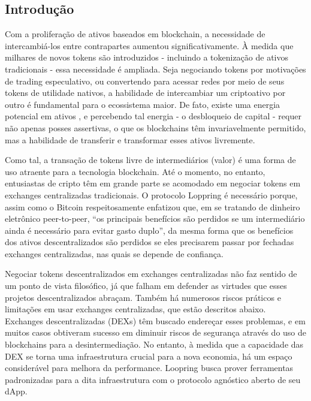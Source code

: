 \documentclass[UTF8,nofonts]{article}
\begin{document}
\begin{multicols}{2}
\section{Introdução\label{sec:introduction}}

Com a proliferação de ativos baseados em blockchain, a necessidade de intercambiá-los entre contrapartes aumentou significativamente. À medida que milhares de novos tokens são introduzidos - incluindo a tokenização de ativos tradicionais - essa necessidade é ampliada. Seja negociando tokens por motivações de trading especulativo, ou convertendo para acessar redes por meio de seus tokens de utilidade nativos, a habilidade de intercambiar um criptoativo por outro é fundamental para o ecossistema maior. De fato, existe uma energia potencial em ativos \cite{desotocapital}, e percebendo tal energia - o desbloqueio de capital - requer não apenas posses assertivas, o que os blockchains têm invariavelmente permitido, mas a habilidade de transferir e transformar esses ativos livremente.
 
Como tal, a transação de tokens livre de intermediários (valor) é uma forma de uso atraente para a tecnologia blockchain. Até o momento, no entanto, entusiastas de cripto têm em grande parte se acomodado em negociar tokens em exchanges centralizadas tradicionais. O protocolo Loppring é necessário porque, assim como o Bitcoin \cite{nakamoto2008bitcoin} respeitosamente enfatizou que, em se tratando de dinheiro eletrônico peer-to-peer, \enquote{os principais benefícios são perdidos se um intermediário ainda é necessário para evitar gasto duplo}, da mesma forma que os benefícios dos ativos descentralizados são perdidos se eles precisarem passar por fechadas exchanges centralizadas, nas quais se depende de confiança.

Negociar tokens descentralizados em exchanges centralizadas não faz sentido de um ponto de vista filosófico, já que falham em defender as virtudes que esses projetos descentralizados abraçam. Também há numerosos riscos práticos e limitações em usar exchanges centralizadas, que estão descritos abaixo. Exchanges descentralizadas (DEXs) \cite{schuh2015bitshares} \cite{bancor} \cite{kyber} têm buscado endereçar esses problemas, e em muitos casos obtiveram sucesso em diminuir riscos de segurança através do uso de blockchains para a desintermediação. No entanto, à medida que a capacidade das DEX se torna uma infraestrutura crucial para a nova economia, há um espaço considerável para melhora da performance. Loopring busca prover ferramentas padronizadas para a dita infraestrutura com o protocolo agnóstico aberto de seu dApp.
\newpage


\end{multicols}
\end{document}
